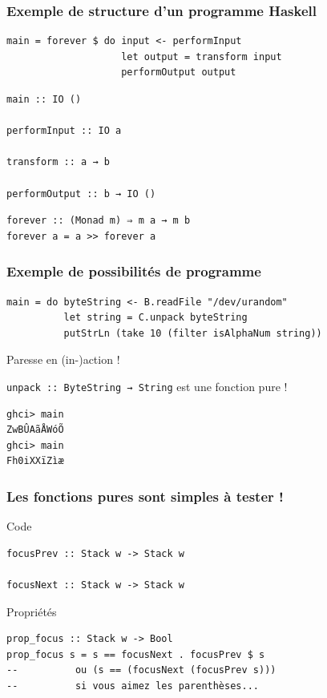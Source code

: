 \documentclass[10pt]{beamer}
\begin{document}
\begin{frame}[fragile]
\frametitle{Exemple de structure d'un programme Haskell}
\begin{verbatim}
main = forever $ do input <- performInput
                    let output = transform input
                    performOutput output
\end{verbatim}

\begin{verbatim}
main :: IO ()

performInput :: IO a

transform :: a → b

performOutput :: b → IO ()
\end{verbatim}

\pause

\begin{verbatim}
forever :: (Monad m) ⇒ m a → m b
forever a = a >> forever a
\end{verbatim}

\end{frame}



\begin{frame}[fragile]
\frametitle{Exemple de possibilités de programme}
\begin{verbatim}
main = do byteString <- B.readFile "/dev/urandom"
          let string = C.unpack byteString
          putStrLn (take 10 (filter isAlphaNum string))
\end{verbatim}

Paresse en (in-)action !

\verb|unpack :: ByteString → String| est une fonction pure !

\begin{verbatim}
ghci> main
ZwBÛAãÅWóÕ
ghci> main
Fh0iXXïZìæ
\end{verbatim}
\end{frame}



\begin{frame}[fragile]
\frametitle{Les fonctions pures sont simples à tester !}
\begin{block}{Code}
\begin{verbatim}
focusPrev :: Stack w -> Stack w

focusNext :: Stack w -> Stack w
\end{verbatim}
\end{block}
\pause
\begin{block}{Propriétés}
\begin{verbatim}
prop_focus :: Stack w -> Bool
prop_focus s = s == focusNext . focusPrev $ s
--          ou (s == (focusNext (focusPrev s)))
--          si vous aimez les parenthèses...
\end{verbatim}
\end{block}
\end{frame}
\end{document}
